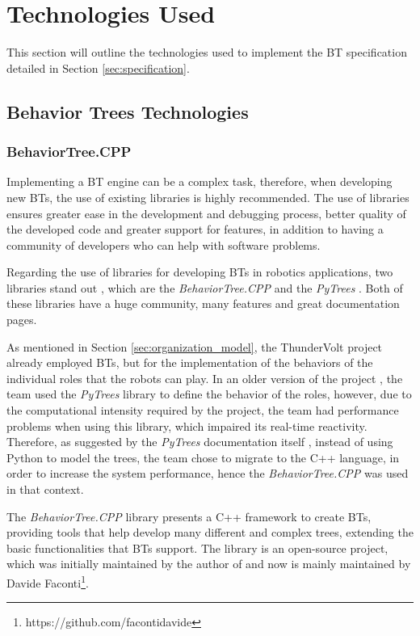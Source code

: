 \section{Technologies Used}
\label{sec:technologies_used}

This section will outline the technologies used to implement the BT specification detailed in Section \ref{sec:specification}.

\subsection{Behavior Trees Technologies}

\subsubsection{BehaviorTree.CPP}

Implementing a BT engine can be a complex task, therefore, when developing new BTs, the use of existing libraries is highly recommended. The use of libraries ensures greater ease in the development and debugging process, better quality of the developed code and greater support for features, in addition to having a community of developers who can help with software problems.

Regarding the use of libraries for developing BTs in robotics applications, two libraries stand out \cite{BTsAndFSMApplications}, which are the \textit{BehaviorTree.CPP} \cite{BehaviorTree.CPP} and the \textit{PyTrees} \cite{PyTrees}. Both of these libraries have a huge community, many features and great documentation pages.

As mentioned in Section \ref{sec:organization_model}, the ThunderVolt project already employed BTs, but for the implementation of the behaviors of the individual roles that the robots can play. In an older version of the project \cite{fira_thundervolt}, the team used the \textit{PyTrees} library to define the behavior of the roles, however, due to the computational intensity required by the project, the team had performance problems when using this library, which impaired its real-time reactivity. Therefore, as suggested by the \textit{PyTrees} documentation itself \cite{PyTreesDesign}, instead of using Python to model the trees, the team chose to migrate to the C++ language, in order to increase the system performance, hence the \textit{BehaviorTree.CPP} was used in that context.

The \textit{BehaviorTree.CPP} library presents a C++ framework to create BTs, providing tools that help develop many different and complex trees, extending the basic functionalities that BTs support. The library is an open-source project, which was initially maintained by the author of \cite{BTsInRobotics} and now is mainly maintained by Davide Faconti\footnote{https://github.com/facontidavide}.

